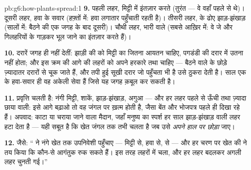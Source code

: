 \begin{solution}{pb:g6:how-plants-spread:1}
\textbf{9.} पहली लहर, मिट्टी में इंतज़ार करते  (तुरंत --- वे वहाँ
पहले से थे)। दूसरी लहर, हवा के सवार (हफ़्तों में: हवा लगातार पहुँचाती
रहती है)। तीसरी लहर,  के ढोए झाड़-झंखाड़ (सालों में: बैठने की एक
जगह के बाद दूसरी)। चौथी लहर, भारी  वाले  (सबसे आख़िर में: वे
जे  और गिलहरियों के गाड़कर भूल जाने का इंतज़ार करते हैं)।

\textbf{10.} दरारें जगह ही नहीं देतीं: झाड़ी की  को मिट्टी का जितना
आयतन चाहिए, पगडंडी की दरार में उतना नहीं होता; और इस क्रम की आगे की
लहरों को अपने हरकारे तथा  चाहिए --- बैठने वाले  के
छोड़े  ज़्यादातर दरारों से चूक जाते हैं, और तपी हुई सूखी दरार जो
पहुँचता भी है उसे ठुकरा देती है। साल एक के हवा-सवार ही वह अकेली सेवा
हैं जिसे यह जगह क़बूल कर सकती है।

\textbf{11.} प्रवृत्ति चलती है: नंगी मिट्टी, शाकें, झाड़-झंखाड़, अगुआ
 --- और हर लहर पहले से ऊँची तथा ज़्यादा छाया वाली: इसे आगे बढ़ाओ तो
वह जंगल पर ख़त्म होती है, जैसा बेंत और भोजपत्र पहले ही दिखा रहे हैं।
अपवाद: काटा या चराया जाने वाला मैदान, जहाँ मनुष्य का स्पर्श हर साल
झाड़-झंखाड़ वाली लहर हटा देता है --- यही सबूत है कि खेत जंगल तक तभी
चलता है जब उसे \emph{अपने हाल पर छोड़ा} जाए।

\textbf{12.} जैसे: `` ने नंगे खेत तक उपनिवेशी पहुँचाए ---
मिट्टी से, हवा से,  से --- और हर चरण पर खेत की  ने
तय किया कि कौन-से आगंतुक रुक सकते हैं। इस तरह  लहरों में चला,
और हर लहर  बदलकर अगली लहर चुनती गई।''
\end{solution}
